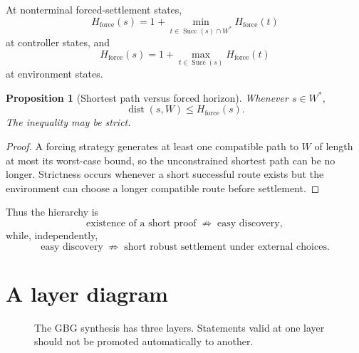 \documentclass[11pt]{article}
\newtheorem{proposition}[definition]{Proposition}
\theoremstyle{remark}
\newcommand{\Succ}{\operatorname{Succ}}
\newcommand{\dist}{\operatorname{dist}}
\begin{document}
At nonterminal forced-settlement states,
\[
H_{\mathrm{force}}(s)
=1+\min_{t\in\Succ(s)\cap W^*}H_{\mathrm{force}}(t)
\]
at controller states, and
\[
H_{\mathrm{force}}(s)
=1+\max_{t\in\Succ(s)}H_{\mathrm{force}}(t)
\]
at environment states.

\begin{proposition}[Shortest path versus forced horizon]
Whenever $s\in W^*$,
\[
\dist(s,W)\le H_{\mathrm{force}}(s).
\]
The inequality may be strict.
\end{proposition}

\begin{proof}
A forcing strategy generates at least one compatible path to $W$ of length at most its worst-case bound, so the unconstrained shortest path can be no longer. Strictness occurs whenever a short successful route exists but the environment can choose a longer compatible route before settlement.
\end{proof}

Thus the hierarchy is
\[
\boxed{\text{existence of a short proof}}
\;\not\Rightarrow\;
\boxed{\text{easy discovery}},
\]
while, independently,
\[
\boxed{\text{easy discovery}}
\;\not\Rightarrow\;
\boxed{\text{short robust settlement under external choices}}.
\]

\section{A layer diagram}

\begin{figure}[ht]
\centering
{}
\caption{The GBG synthesis has three layers. Statements valid at one layer should not be promoted automatically to another.}
\end{figure}
\end{document}
